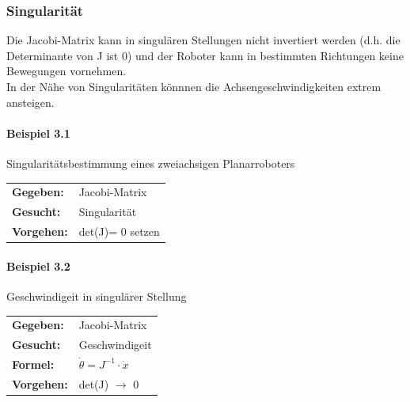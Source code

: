 \subsubsection{Singularität}
Die Jacobi-Matrix kann in singulären Stellungen
nicht invertiert werden (d.h. die Determinante von J ist 0) und der Roboter
kann in bestimmten Richtungen keine Bewegungen
vornehmen. \\
In der Nähe von Singularitäten könnnen die Achsengeschwindigkeiten extrem ansteigen.
\begin{multicols}{2}
\paragraph{Beispiel 3.1} Singularitätsbestimmung eines zweiachsigen Planarroboters\newline
\null\hspace{0.5cm}\begin{tabular}{ll}
    \textbf{Gegeben:}& Jacobi-Matrix\\
    \textbf{Gesucht:}& Singularität\\
    \textbf{Vorgehen:} & det(J)= 0 setzen\\
\end{tabular}
\paragraph{Beispiel 3.2} Geschwindigeit in singulärer Stellung\newline
\null\hspace{0.5cm}\begin{tabular}{ll}
    \textbf{Gegeben:}& Jacobi-Matrix\\
    \textbf{Gesucht:}& Geschwindigeit\\
    \textbf{Formel:} & $ \dot{\theta}= J^{-1}\cdot \dot{x}$\\
    \textbf{Vorgehen:} & det(J) $\rightarrow$ 0 \\
\end{tabular}
\end{multicols}
